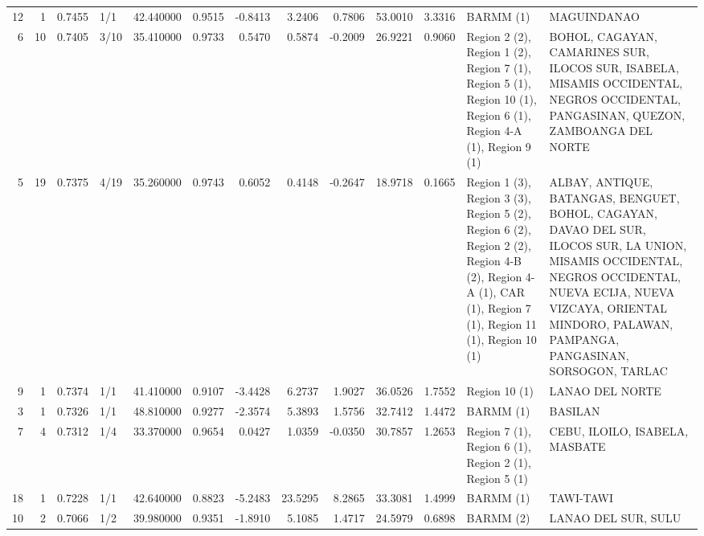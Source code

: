 \begin{tabular}{rrrlrrrrrrrll}
12 & 1 & {\cellcolor[HTML]{9FBFFF}} \color[HTML]{000000} 0.7455 & 1/1 & {\cellcolor[HTML]{F2CAB5}} \color[HTML]{000000} 42.440000 & 0.9515 & -0.8413 & 3.2406 & 0.7806 & 53.0010 & 3.3316 & BARMM (1) & MAGUINDANAO \\
6 & 10 & {\cellcolor[HTML]{92B4FE}} \color[HTML]{000000} 0.7405 & 3/10 & {\cellcolor[HTML]{6F92F3}} \color[HTML]{F1F1F1} 35.410000 & 0.9733 & 0.5470 & 0.5874 & -0.2009 & 26.9221 & 0.9060 & Region 2 (2), Region 1 (2), Region 7 (1), Region 5 (1), Region 10 (1), Region 6 (1), Region 4-A (1), Region 9 (1) & BOHOL, CAGAYAN, CAMARINES SUR, ILOCOS SUR, ISABELA, MISAMIS OCCIDENTAL, NEGROS OCCIDENTAL, PANGASINAN, QUEZON, ZAMBOANGA DEL NORTE \\
5 & 19 & {\cellcolor[HTML]{89ACFD}} \color[HTML]{000000} 0.7375 & 4/19 & {\cellcolor[HTML]{6C8FF1}} \color[HTML]{F1F1F1} 35.260000 & 0.9743 & 0.6052 & 0.4148 & -0.2647 & 18.9718 & 0.1665 & Region 1 (3), Region 3 (3), Region 5 (2), Region 6 (2), Region 2 (2), Region 4-B (2), Region 4-A (1), CAR (1), Region 7 (1), Region 11 (1), Region 10 (1) & ALBAY, ANTIQUE, BATANGAS, BENGUET, BOHOL, CAGAYAN, DAVAO DEL SUR, ILOCOS SUR, LA UNION, MISAMIS OCCIDENTAL, NEGROS OCCIDENTAL, NUEVA ECIJA, NUEVA VIZCAYA, ORIENTAL MINDORO, PALAWAN, PAMPANGA, PANGASINAN, SORSOGON, TARLAC \\
9 & 1 & {\cellcolor[HTML]{89ACFD}} \color[HTML]{000000} 0.7374 & 1/1 & {\cellcolor[HTML]{E7D7CE}} \color[HTML]{000000} 41.410000 & 0.9107 & -3.4428 & 6.2737 & 1.9027 & 36.0526 & 1.7552 & Region 10 (1) & LANAO DEL NORTE \\
3 & 1 & {\cellcolor[HTML]{7B9FF9}} \color[HTML]{F1F1F1} 0.7326 & 1/1 & {\cellcolor[HTML]{B40426}} \color[HTML]{F1F1F1} 48.810000 & 0.9277 & -2.3574 & 5.3893 & 1.5756 & 32.7412 & 1.4472 & BARMM (1) & BASILAN \\
7 & 4 & {\cellcolor[HTML]{799CF8}} \color[HTML]{F1F1F1} 0.7312 & 1/4 & {\cellcolor[HTML]{465ECF}} \color[HTML]{F1F1F1} 33.370000 & 0.9654 & 0.0427 & 1.0359 & -0.0350 & 30.7857 & 1.2653 & Region 7 (1), Region 6 (1), Region 2 (1), Region 5 (1) & CEBU, ILOILO, ISABELA, MASBATE \\
18 & 1 & {\cellcolor[HTML]{6282EA}} \color[HTML]{F1F1F1} 0.7228 & 1/1 & {\cellcolor[HTML]{F3C7B1}} \color[HTML]{000000} 42.640000 & 0.8823 & -5.2483 & 23.5295 & 8.2865 & 33.3081 & 1.4999 & BARMM (1) & TAWI-TAWI \\
10 & 2 & {\cellcolor[HTML]{3B4CC0}} \color[HTML]{F1F1F1} 0.7066 & 1/2 & {\cellcolor[HTML]{CFDAEA}} \color[HTML]{000000} 39.980000 & 0.9351 & -1.8910 & 5.1085 & 1.4717 & 24.5979 & 0.6898 & BARMM (2) & LANAO DEL SUR, SULU \\
\bottomrule
\end{tabular}
